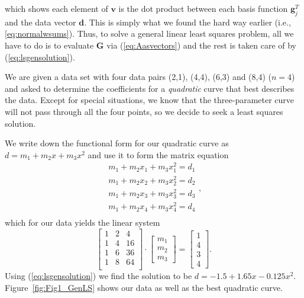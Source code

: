 which shows each element of $\mathbf{v}$ is the dot product between each basis function $\mathbf{g}_j^T$ and the data vector $\mathbf{d}$.
This is simply what we found the hard way earlier (i.e., \ref{eq:normalwsums}).
Thus, to solve a general linear least squares problem, all we have to do is to evaluate $\mathbf{G}$ via (\ref{eq:Aasvectors}) and
the rest is taken care of by (\ref{eq:lsgensolution}).
\begin{example}
We are given a data set with four data pairs (2,1), (4,4), (6,3) and (8,4) ($n = 4$) and asked to determine the
coefficients for a \emph{quadratic} curve that best describes the data.  Except for special situations, we know that the
three-parameter curve will not pass through all the four points, so we decide to seek a least squares solution.

We write down the functional form for our quadratic curve as $d = m_1 + m_2 x + m_3 x^2$ and use it to
form the matrix equation
\begin{equation} \begin{array}{c}
m_1 + m_2 x_1 + m_3 x_1^2 = d_1\\[6pt]
m_1 + m_2 x_2 + m_3 x_2^2 = d_2\\[6pt]
m_1 + m_2 x_3 + m_3 x_3^2 = d_3\\[6pt]
m_1 + m_2 x_4 + m_3 x_4^2 = d_4\\[6pt]
\end{array},
\end{equation}
which for our data yields the linear system
\begin{equation}
 \left [
\begin{array}{ccccc}
1 & 2 & 4 \\	 
1 & 4 & 16 \\
1 & 6 & 36 \\
1 & 8 & 64 \\
\end{array} \right ]
\cdot
\left [ \begin{array}{c} 
m_1\\ m_2\\ m_3  \end{array}   \right]
=
\left [ \begin{array}{c} 1\\ 4 \\ 3 \\ 4  \end{array} \right ] .
\end{equation}
Using (\ref{eq:lsgensolution}) we find the solution to be
$d = -1.5 + 1.65 x -0.125x^2$.  Figure~\ref{fig:Fig1_GenLS} shows our data as well as the best quadratic curve.
\end{example}

